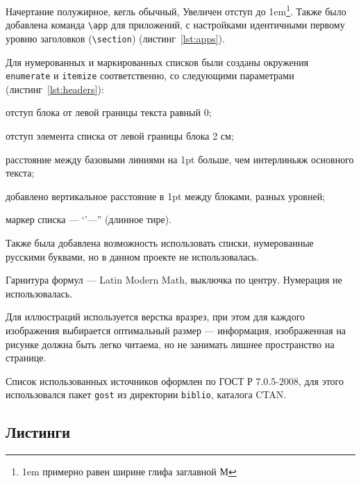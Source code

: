 Начертание полужирное, кегль обычный, Увеличен отступ до 1em\footnote{1em примерно равен ширине глифа заглавной М}. Также было добавлена команда \texttt{\textbackslash app} для приложений, с настройками идентичными первому уровню заголовков (\texttt{\textbackslash section}) (листинг~\ref{lst:apps}).



Для нумерованных и маркированных списков были созданы окружения \texttt{enumerate\*} и \texttt{itemize\*} соответственно, со следующими параметрами (листинг~\ref{lst:headers}):

\begin{itemize*}
	\item отступ блока от левой границы текста равный 0;
	\item отступ элемента списка от левой границы блока 2 см;
	\item расстояние между базовыми линиями на 1pt больше, чем интерлиньяж основного текста;
	\item добавлено вертикальное расстояние в 1pt между блоками, разных уровней;
	\item маркер списка --- `'---'' (длинное тире).
\end{itemize*}

Также была добавлена возможность использовать списки, нумерованные русскими буквами, но в данном проекте не использовалась.


Гарнитура формул --- Latin Modern Math, выключка по центру. Нумерация не использовалась.

Для иллюстраций используется верстка вразрез, при этом для каждого изображения выбирается оптимальный размер --- информация, изображенная на рисунке должна быть легко читаема, но не занимать лишнее пространство на странице.

Список использованных источников оформлен по ГОСТ Р 7.0.5-2008\cite{GOST705}, для этого использовался пакет \texttt{gost} из директории \texttt{biblio}, каталога CTAN.

\subsection{Листинги}
\label{sec:listings}

